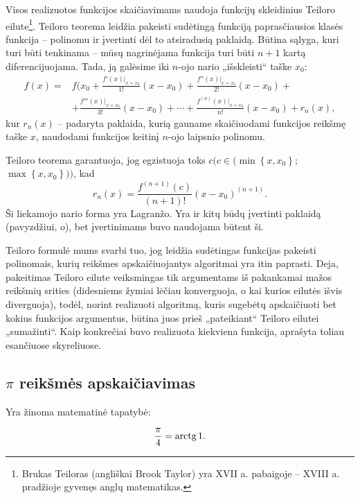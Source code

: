 Visos realizuotos funkcijos skaičiavimams naudoja funkcijų skleidinius
Teiloro eilute\footnote{Brukas Teiloras (angliškai Brook Taylor) yra 
XVII a. pabaigoje – XVIII a. pradžioje gyvenęs anglų matematikas.}.
Teiloro teorema leidžia pakeisti sudėtingą funkciją paprasčiausios 
klasės funkcija – polinomu ir įvertinti dėl to atsiradusią paklaidą.
Būtina sąlyga, kuri turi būti tenkinama – mūsų nagrinėjama funkcija
turi būti $n+1$ kartą diferencijuojama. Tada, ją galėsime iki $n$-ojo
nario „išskleisti“ taške $x_{0}$:
\begin{align*}
  f(x) 
  =& f(x_{0} + \frac{f'(x)|_{x=x_{0}}}{1!} (x - x_{0}) + %
  \frac{f''(x)|_{x=x_{0}}}{2!} (x - x_{0}) + \\
  &+ \frac{f'''(x)|_{x=x_{0}}}{3!} (x - x_{0}) + \cdots +
  \frac{f^{(n)}(x)|_{x=x_{0}}}{n!} (x - x_{0}) + r_{n}(x),
\end{align*}
kur $r_{n}(x)$ – padaryta paklaida, kurią gauname skaičiuodami funkcijos
reikšmę taške $x$, naudodami funkcijos keitinį $n$-ojo laipsnio polinomu.

Teiloro teorema garantuoja, jog egzistuoja toks 
$c (c \in (\min \left\{ x, x_{0} \right\}; $%
$\max \left\{ x, x_{0} \right\}))$, kad
\begin{equation*}
  r_{n}(x) = \frac{f^{(n+1)}(c)}{(n+1)!} (x - x_{0})^{(n+1)}.
\end{equation*}
Ši liekamojo nario forma yra Lagranžo. Yra ir kitų būdų įvertinti paklaidą
(pavyzdžiui, $o$), bet įvertinimams buvo naudojama būtent ši. 

Teiloro formulė mums svarbi tuo, jog leidžia sudėtingas funkcijas pakeisti
polinomais, kurių reikšmes apskaičiuojantys algoritmai yra itin paprasti.
Deja, pakeitimas Teiloro eilute veiksmingas tik argumentams iš pakankamai
mažos reikšmių srities (didesniems žymiai lėčiau konverguoja, o kai 
kurios eilutės išvis diverguoja), todėl, norint realizuoti algoritmą,
kuris sugebėtų apskaičiuoti bet kokius funkcijos argumentus, būtina
juos prieš „pateikiant“ Teiloro eilutei „sumažinti“. Kaip konkrečiai 
buvo realizuota kiekviena funkcija, aprašyta toliau esančiuose skyreliuose.

\subsection{$\pi$ reikšmės apskaičiavimas}

Yra žinoma matematinė tapatybė:

\begin{equation}
  \frac{\pi}{4} = \mathop{\text{arctg}} 1.
  \label{pi_1}
\end{equation}

